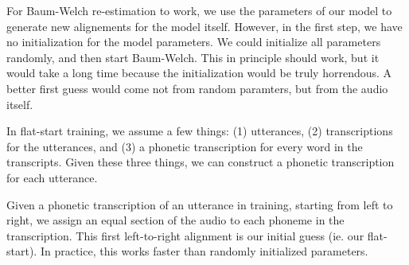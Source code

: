 \documentclass[10pt,a4paper]{article}
\begin{document}
For Baum-Welch re-estimation to work, we use the parameters of our model to generate new alignements for the model itself. However, in the first step, we have no initialization for the model parameters. We could initialize all parameters randomly, and then start Baum-Welch. This in principle should work, but it would take a long time because the initialization would be truly horrendous. A better first guess would come not from random paramters, but from the audio itself.

In flat-start training, we assume a few things: (1) utterances, (2) transcriptions for the utterances, and (3) a phonetic transcription for every word in the transcripts. Given these three things, we can construct a phonetic transcription for each utterance.  

Given a phonetic transcription of an utterance in training, starting from left to right, we assign an equal section of the audio to each phoneme in the transcription. This first left-to-right alignment is our initial guess (ie. our flat-start). In practice, this works faster than randomly initialized parameters.

  
      
  
\end{document}
